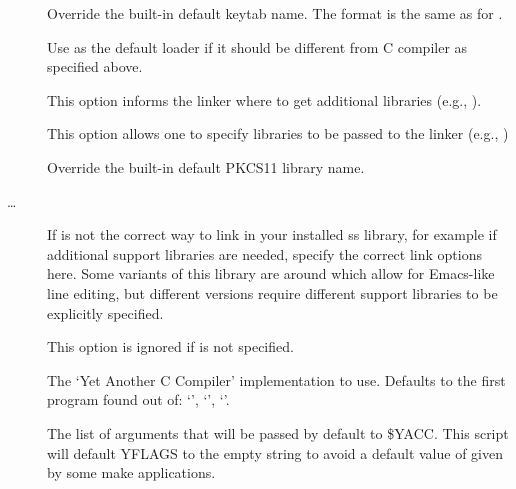 \documentclass[letterpaper,10pt,english]{sphinxmanual}
\begin{document}
\begin{description}
\item[{}] \leavevmode
Override the built-in default keytab name.
The format is the same as for .

\item[{}] \leavevmode
Use  as the default loader if it should be different from
C compiler as specified above.

\item[{}] \leavevmode
This option informs the linker where to get additional libraries
(e.g., ).

\item[{}] \leavevmode
This option allows one to specify libraries to be passed to the
linker (e.g., )

\item[{}] \leavevmode
Override the built-in default PKCS11 library name.

\item[{…}] \leavevmode
If  is not the correct way to link in your installed ss
library, for example if additional support libraries are needed,
specify the correct link options here.  Some variants of this
library are around which allow for Emacs-like line editing, but
different versions require different support libraries to be
explicitly specified.

This option is ignored if \sphinxstylestrong{-} is not specified.

\item[{}] \leavevmode
The ‘Yet Another C Compiler’ implementation to use. Defaults to
the first program found out of: ‘’, ‘’,
‘’.

\item[{}] \leavevmode
The list of arguments that will be passed by default to \$YACC.
This script will default YFLAGS to the empty string to avoid a
default value of  given by some make applications.

\end{description}
\end{document}
